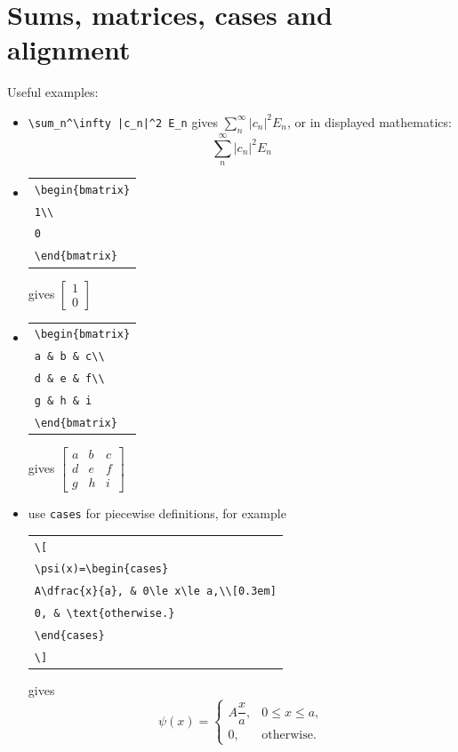 \documentclass[12pt]{article}
\begin{document}
\section{Sums, matrices, cases and alignment}
Useful examples:
\begin{itemize}
\item \verb!\sum_n^\infty |c_n|^2 E_n! gives $\sum_n^\infty |c_n|^2 E_n$, or in displayed mathematics:
\[
\sum_n^\infty |c_n|^2 E_n
\]
\item
\begin{tabular}[t]{@{}l@{}}
	\verb|\begin{bmatrix}|\\
		\verb|1\\|\\
		\verb|0|\\
		\verb|\end{bmatrix}|
\end{tabular}
\qquad gives \qquad
$\begin{bmatrix}
	1\\
	0
\end{bmatrix}$

\item
\begin{tabular}[t]{@{}l@{}}
	\verb|\begin{bmatrix}|\\
		\verb|a & b & c\\|\\
		\verb|d & e & f\\|\\
		\verb|g & h & i|\\
		\verb|\end{bmatrix}|
\end{tabular}
\qquad gives \qquad
$\begin{bmatrix}
	a & b & c\\
	d & e & f\\
	g & h & i
\end{bmatrix}$

\item use \verb|cases| for piecewise definitions, for example

	\begin{tabular}{@{}l@{}}
		\verb|\[|\\
		\verb|\psi(x)=\begin{cases}|\\
			\verb|A\dfrac{x}{a}, & 0\le x\le a,\\[0.3em]|\\
			\verb|0, & \text{otherwise.}|\\
			\verb|\end{cases}|\\
		\verb|\]|
	\end{tabular}
	
gives
\[
\psi(x)=\begin{cases}
	A\dfrac{x}{a}, & 0\le x\le a,\\[0.3em]
	0, & \text{otherwise.}
\end{cases}
\]

\end{itemize}
\end{document}
